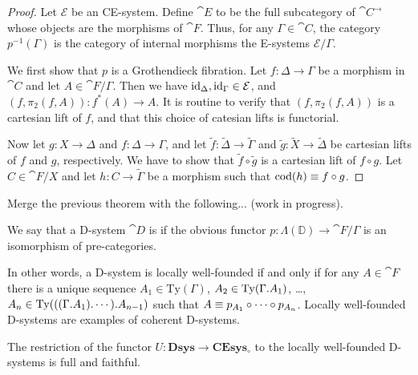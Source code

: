 \begin{proof}
Let $\mathcal{E}$ be an CE-system. Define $\cat{E}$ to be the full subcategory
of $\cat{C}^\to$ whose objects are the morphisms of $\cat{F}$. Thus, for any
$\Gamma\in\cat{C}$, the category $p^{-1}(\Gamma)$ is the category of internal
morphisms the E-systems $\mathcal{E}/\Gamma$. 

We first show that $p$ is a Grothendieck fibration. Let $f:\Delta\to\Gamma$ be
a morphism in $\cat{C}$ and let $A\in\cat{F}/\Gamma$. Then we have ${\mathrm{id}_{\Delta}},{\mathrm{id}_{\Gamma}}\in\mathcal{E}$,
and $(f,\pi_2(f,A)):f^\ast(A)\to A$. It is routine to verify that $(f,\pi_2(f,A))$
is a cartesian lift of $f$, and that this choice of catesian lifts is functorial. 

Now let $g:X\to\Delta$ and $f:\Delta\to \Gamma$, and let $\tilde{f}:\tilde{\Delta}\to\tilde{\Gamma}$ and
$\tilde{g}:\tilde{X}\to\tilde{\Delta}$ be cartesian lifts of $f$ and $g$, respectively. We have to show
that $\tilde{f}\circ \tilde{g}$ is a cartesian lift of $f\circ g$. Let $C\in\cat{F}/X$ and
let $h : C\to \tilde{\Gamma}$ be a morphism such that $\mathrm{cod}(h)\equiv f\circ g$. 
\end{proof}

Merge the previous theorem with the following... (work in progress).

\begin{defn}
We say that a D-system $\cat{D}$ is  if the obvious functor
$p:\Lambda(\mathbb{D})\to\cat{F}/\Gamma$ is an isomorphism of pre-categories.
\end{defn}

\begin{rmk}
In other words, a D-system is locally well-founded if and only if
for any $A\in\cat{F}$ there is a unique sequence
$A_1\in\mathrm{Ty}(\Gamma)$, $A_2\in\mathrm{Ty}(\ctxext{\Gamma}{A_1})$, \ldots,
$A_n\in\mathrm{Ty}(\ctxext{{{\Gamma}{A_1}}{\cdots}}{A_{n-1}})$ such that
$A\equiv p_{A_1}\circ\cdots\circ p_{A_n}$. Locally well-founded D-systems 
are examples of coherent D-systems.
\end{rmk}

\begin{thm}
The restriction of the functor $U:\mathbf{Dsys}\to\mathbf{CEsys_{\circ}}$ to the
locally well-founded D-systems is full and faithful.
\end{thm}

